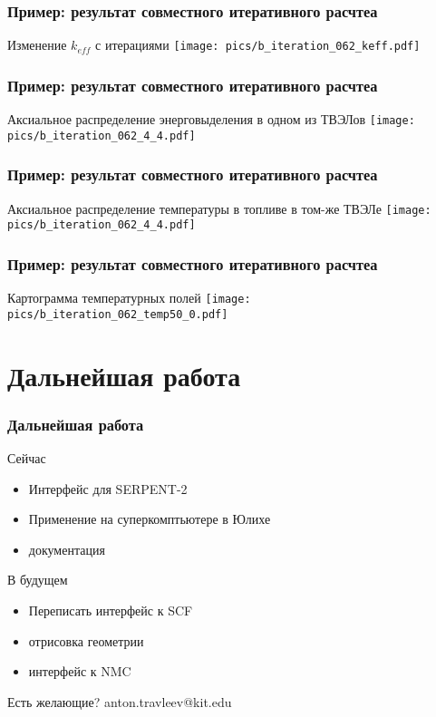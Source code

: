\documentclass[t]{beamer}
\begin{document}
\begin{frame}\frametitle{Пример: результат совместного итеративного расчтеа}

    Изменение $k_{eff}$ с итерациями
    \texttt{[image: pics/b\_iteration\_062\_keff.pdf]}
\end{frame}

\begin{frame}\frametitle{Пример: результат совместного итеративного расчтеа}
    Аксиальное распределение энерговыделения в одном из ТВЭЛов
    \texttt{[image: pics/b\_iteration\_062\_4\_4.pdf]}
\end{frame}

\begin{frame}\frametitle{Пример: результат совместного итеративного расчтеа}
    Аксиальное распределение температуры в топливе в том-же ТВЭЛе
    \texttt{[image: pics/b\_iteration\_062\_4\_4.pdf]}
\end{frame}

\begin{frame}\frametitle{Пример: результат совместного итеративного расчтеа}
    Картограмма температурных полей
            \texttt{[image: pics/b\_iteration\_062\_temp50\_0.pdf]}
\end{frame}


\section{Дальнейшая работа}
\begin{frame}\frametitle{Дальнейшая работа}

    \begin{block}{Сейчас}
        \begin{itemize}
            \item Интерфейс для SERPENT-2
            \item Применение на суперкомптьютере в Юлихе
            \item документация
        \end{itemize}
    \end{block}

    \begin{block}{В будущем}
        \begin{itemize}
            \item Переписать интерфейс к SCF
            \item отрисовка геометрии
            \item интерфейс к NMC 
        \end{itemize}
    \end{block}

    Есть желающие? anton.travleev@kit.edu


\end{frame}
\end{document}
